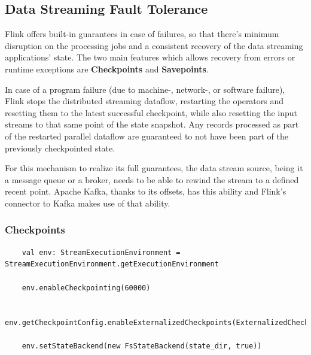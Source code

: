 \subsection{Data Streaming Fault Tolerance}

Flink offers built-in guarantees in case of failures, so that there's minimum disruption on the processing jobs and a consistent recovery of the data streaming applications' state. The two main features which allows recovery from errors or runtime exceptions are \textbf{Checkpoints} and \textbf{Savepoints}.

In case of a program failure (due to machine-, network-, or software failure), Flink stops the distributed streaming dataflow, restarting the operators and resetting them to the latest successful checkpoint, while also resetting the input streams to that same point of the state snapshot. Any records processed as part of the restarted parallel dataflow are guaranteed to not have been part of the previously checkpointed state.

For this mechanism to realize its full guarantees, the data stream source, being it a message queue or a broker, needs to be able to rewind the stream to a defined recent point. Apache Kafka, thanks to its offsets, has this ability and Flink’s connector to Kafka makes use of that ability.

\subsubsection{Checkpoints}

\begin{code}
    \label{code:checkpointing}
    \begin{verbatim}
    val env: StreamExecutionEnvironment = StreamExecutionEnvironment.getExecutionEnvironment
    
    env.enableCheckpointing(60000)
    
    env.getCheckpointConfig.enableExternalizedCheckpoints(ExternalizedCheckpointCleanup.RETAIN_ON_CANCELLATION)
    
    env.setStateBackend(new FsStateBackend(state_dir, true)) 
    \end{verbatim}
\end{code}~\\

